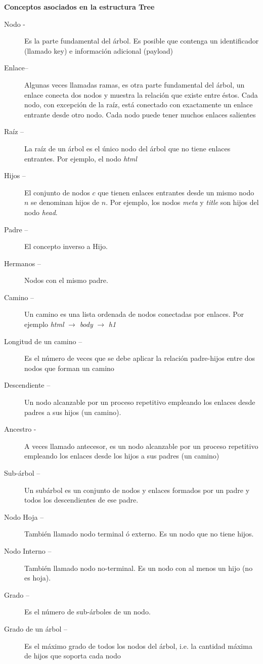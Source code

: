 \textbf{Conceptos asociados en la estructura Tree}
\begin{description}
\item[Nodo -] Es la parte fundamental del árbol. Es posible que contenga un identificador (llamado key) e información adicional (payload)
\item[Enlace– ] Algunas veces llamadas ramas, es otra parte fundamental del árbol, un enlace conecta dos nodos y muestra la relación que existe entre éstos. Cada nodo, con excepción de la raíz, está conectado con exactamente un enlace entrante desde otro nodo. Cada nodo puede tener muchos enlaces salientes
\item[Raíz –] La raíz de un árbol es el único nodo del árbol que no tiene enlaces entrantes. Por ejemplo, el nodo \textit{html}
\item[Hijos –] El conjunto de nodos $c$ que tienen enlaces entrantes desde un mismo nodo $n$ se denominan hijos de $n$. Por ejemplo, los nodos \textit{meta} y \textit{title} son hijos del nodo \textit{head}.
\item[Padre –] El concepto inverso a Hijo.
\item[Hermanos –] Nodos con el mismo padre.
\item[Camino –] Un camino es una lista ordenada de nodos conectadas por enlaces. Por ejemplo \textit{html} $\to$ \textit{body} $\to$ \textit{h1}
\item[Longitud de un camino –] Es el número de veces que se debe aplicar la relación padre-hijos entre dos nodos que forman un camino
\item[Descendiente –] Un nodo alcanzable por un proceso repetitivo empleando los enlaces desde padres a sus hijos (un camino).
\item[Ancestro -] A veces llamado antecesor, es un nodo alcanzable por un proceso repetitivo empleando los enlaces desde los hijos a sus padres (un camino)
\item[Sub-árbol –] Un subárbol es un conjunto de nodos y enlaces formados por un padre y todos los descendientes de ese padre.
\item[Nodo Hoja –] También llamado nodo terminal ó externo. Es un nodo que no tiene hijos.
\item[Nodo Interno –] También llamado nodo no-terminal. Es un nodo con al menos un hijo (no es hoja).
\item[Grado –] Es el número de sub-árboles de un nodo.
\item[Grado de un árbol –] Es el máximo grado de todos los nodos del árbol, i.e. la cantidad máxima de hijos que soporta cada nodo

\end{description}
